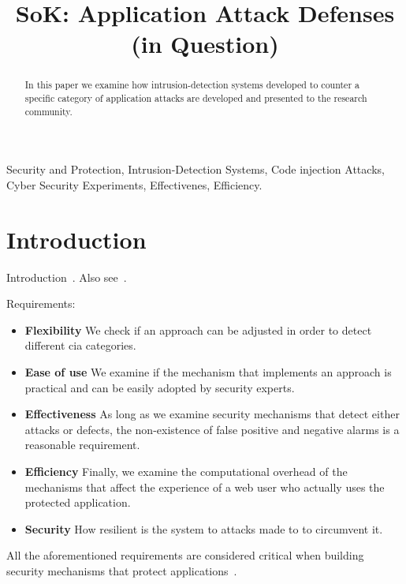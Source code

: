 \documentclass[conference]{IEEEtran}
\date{}
\begin{document}
\author{
}

\title{SoK: Application Attack Defenses (in Question)}

\maketitle
\begin{abstract}
In this paper we examine how intrusion-detection
systems developed to counter a specific category
of application attacks are developed and presented to
the research community.
\end{abstract}

\begin{IEEEkeywords}
Security and Protection, Intrusion-Detection Systems, Code injection Attacks, Cyber Security Experiments, Effectivenes, Efficiency.
\end{IEEEkeywords}

\IEEEpeerreviewmaketitle

\section{Introduction}

Introduction~\cite{I05}. Also see~\cite{A00}.

Requirements:
\begin{itemize}
\item {\bf Flexibility} We check if an approach
can be adjusted in order to detect different {\sc cia} categories.
\item {\bf Ease of use} We examine if the mechanism that
implements an approach is practical and can be easily adopted
by security experts.
\item {\bf Effectiveness} As long as we examine security
mechanisms that detect either attacks or defects,
the non-existence of false positive and negative alarms
is a reasonable requirement.
\item {\bf Efficiency} Finally, we examine
the computational overhead of the mechanisms that affect the experience of
a web user who actually uses the protected application.
\item {\bf Security} How resilient is the system to
attacks made to to circumvent it.
\end{itemize}
All the aforementioned requirements are considered critical
when building security mechanisms that protect
applications~\cite{A01,A00}.
\end{document}
